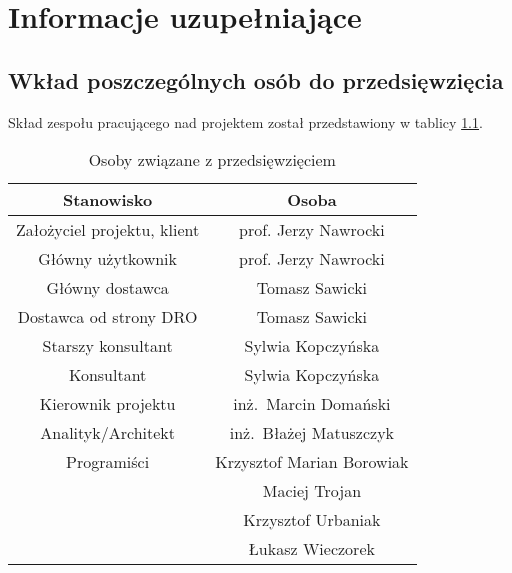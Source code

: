 \chapter{Informacje uzupełniające}
\label{Chapter10}

\section{Wkład poszczególnych osób do przedsięwzięcia}
\label{Chapter101}

Skład zespołu pracującego nad projektem został przedstawiony w tablicy \ref{tab:roster}.

\begin{table}[H]
\centering
\begin{tabular}{ | c | c | }
\hline
\textbf{Stanowisko} & \textbf{Osoba} \\ \hline
Założyciel projektu, klient & prof. Jerzy Nawrocki \\ \hline
Główny użytkownik & prof. Jerzy Nawrocki \\ \hline
Główny dostawca & Tomasz Sawicki \\ \hline
Dostawca od strony DRO & Tomasz Sawicki \\ \hline
Starszy konsultant & Sylwia Kopczyńska \\ \hline
Konsultant & Sylwia Kopczyńska \\ \hline
Kierownik projektu & inż.~Marcin Domański \\ \hline
Analityk/Architekt & inż.~Błażej Matuszczyk \\ \hline
Programiści & Krzysztof Marian Borowiak \\ 
 & Maciej Trojan \\ 
 & Krzysztof Urbaniak \\ 
 & Łukasz Wieczorek \\
\hline
\end{tabular}
\caption{Osoby związane z przedsięwzięciem}\label{tab:roster}
\end{table}

\noindent


